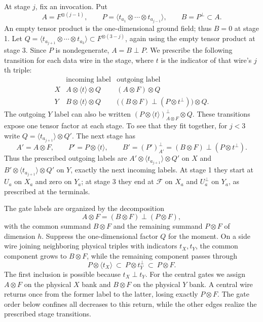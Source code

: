 \documentclass[11pt]{article}
\theoremstyle{definition}
\begin{document}
At stage $j$, fix an invocation.  Put
\[
 A=F^{\otimes(j-1)},\qquad
 P=\langle t_{a_1}\otimes\cdots\otimes t_{a_{j-1}}\rangle,
 \qquad B=P^\perp\subset A.
\]
An empty tensor product is the one-dimensional ground field; thus
$B=0$ at stage 1.  Let
$Q=\langle t_{a_{j+1}}\otimes\cdots\otimes t_{a_3}\rangle
\subset F^{\otimes(3-j)}$, again using the empty tensor product at
stage 3.  Since $P$ is nondegenerate,
$A=B\mathbin{\perp}P$.  
We prescribe the following transition for each data wire in the stage,
where $t$ is the indicator of that wire's $j$th triple:
\[
\begin{array}{c|c|c}
 &\text{incoming label}&\text{outgoing label}\\ \hline
 X&A\otimes\langle t\rangle\otimes Q&(A\otimes F)\otimes Q\\
 Y&B\otimes\langle t\rangle\otimes Q&
 \bigl((B\otimes F)\mathbin{\perp}(P\otimes t^\perp)\bigr)\otimes Q.
\end{array}
\]
The outgoing $Y$ label can also be written
$(P\otimes\langle t\rangle)^\perp_{A\otimes F}\otimes Q$.
These transitions expose one tensor factor at each stage. To see that
they fit together, for $j<3$ write
$Q=\langle t_{a_{j+1}}\rangle\otimes Q'$. The next stage has
\[
 A'=A\otimes F,\qquad
 P'=P\otimes\langle t\rangle,\qquad
 B'=(P')^\perp_{A'}
    =(B\otimes F)\mathbin{\perp}(P\otimes t^\perp).
\]
Thus the prescribed outgoing labels are
$A'\otimes\langle t_{a_{j+1}}\rangle\otimes Q'$ on $X$ and
$B'\otimes\langle t_{a_{j+1}}\rangle\otimes Q'$ on $Y$, exactly
the next incoming labels. At stage 1 they start at $U_a$ on $X_a$
and zero on $Y_a$; at stage 3 they end at $\mathcal F$ on $X_a$
and $U_a^\perp$ on $Y_a$, as prescribed at the terminals.

The gate labels are organized by the decomposition
\[
 A\otimes F=(B\otimes F)\mathbin{\perp}(P\otimes F),
\]
with the common summand $B\otimes F$ and the remaining summand
$P\otimes F$ of dimension $h$. Suppress the one-dimensional factor
$Q$ for the moment. On a side wire joining neighboring physical triples
with indicators $t_X,t_Y$, the common component grows to $B\otimes F$,
while the remaining component passes through
\[
 P\otimes\langle t_X\rangle
 \ \subset\ P\otimes t_Y^\perp
 \ \subset\ P\otimes F.
\]
The first inclusion is possible because $t_X\perp t_Y$.
For the central gates we assign $A\otimes F$ on the physical $X$
bank and $B\otimes F$ on the physical $Y$ bank. A central wire
returns once from the former label to the latter, losing exactly
$P\otimes F$. The gate order below confines all decreases to this
return, while the other edges realize the prescribed stage transitions.
\end{document}
